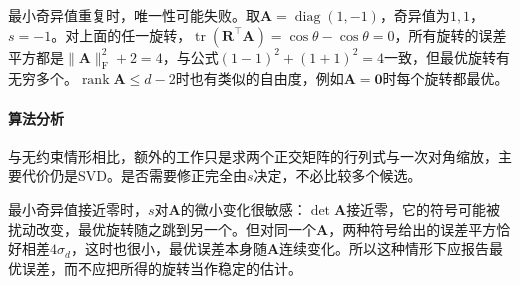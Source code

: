 最小奇异值重复时，唯一性可能失败。取$\bm A=\operatorname{diag}(1,-1)$，奇异值为$1,1$，$s=-1$。对上面的任一旋转，$\operatorname{tr}(\bm R^\top\bm A)=\cos\theta-\cos\theta=0$，所有旋转的误差平方都是$\lVert\bm A\rVert_{\mathrm F}^2+2=4$，与公式$(1-1)^2+(1+1)^2=4$一致，但最优旋转有无穷多个。$\operatorname{rank}\bm A\leq d-2$时也有类似的自由度，例如$\bm A=\bm0$时每个旋转都最优。

\paragraph{算法分析}

与无约束情形相比，额外的工作只是求两个正交矩阵的行列式与一次对角缩放，主要代价仍是SVD。是否需要修正完全由$s$决定，不必比较多个候选。

最小奇异值接近零时，$s$对$\bm A$的微小变化很敏感：$\det\bm A$接近零，它的符号可能被扰动改变，最优旋转随之跳到另一个。但对同一个$\bm A$，两种符号给出的误差平方恰好相差$4\sigma_d$，这时也很小，最优误差本身随$\bm A$连续变化。所以这种情形下应报告最优误差，而不应把所得的旋转当作稳定的估计。
